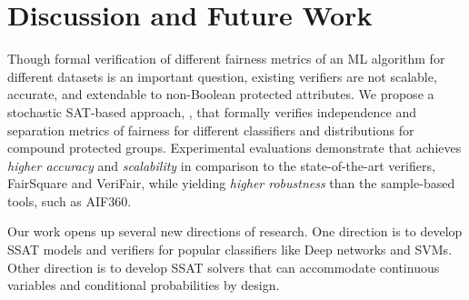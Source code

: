 \section{Discussion and Future Work}
Though formal verification of different fairness metrics of an ML algorithm for different datasets is an important question, existing verifiers are not scalable, accurate, and extendable to non-Boolean protected attributes. We propose a stochastic SAT-based approach, {\justicia}, that formally verifies independence and separation metrics of fairness for different classifiers and distributions for compound protected groups.
Experimental evaluations demonstrate that {\justicia} achieves \textit{higher accuracy} and \textit{scalability} in comparison to the state-of-the-art verifiers, FairSquare and VeriFair, while yielding \textit{higher robustness} than the sample-based tools, such as AIF360.

Our work opens up several new directions of research. One direction is to develop SSAT models and verifiers for popular classifiers like Deep networks and SVMs. Other direction is to develop SSAT solvers that can accommodate continuous variables and conditional probabilities by design.

